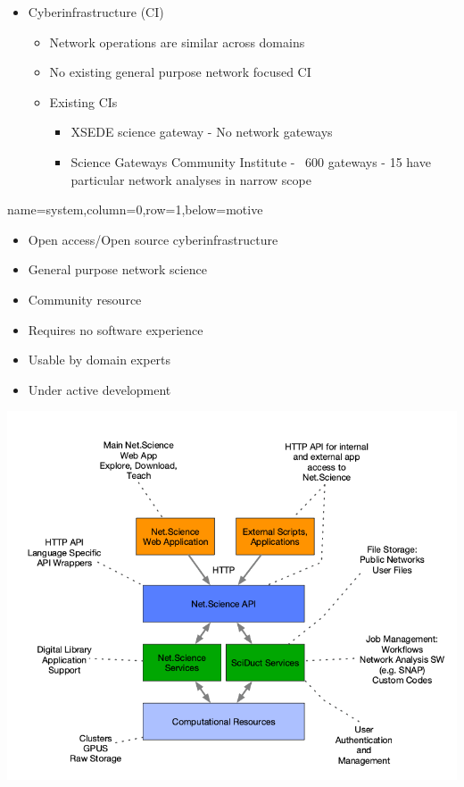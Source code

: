\documentclass[landscape,paperwidth=70in,paperheight=46in,fontscale=0.225]{baposter} %
\begin{document}
\begin{poster}
{\begin{itemize}[leftmargin=*,noitemsep,topsep=0pt]
\item Cyberinfrastructure (CI)
	\begin{itemize}
	\item Network operations are similar across domains
	\item No existing general purpose network focused CI
	\item Existing CIs
	\begin{itemize}
	    \item XSEDE science gateway - No network gateways
	    \item Science Gateways Community Institute - ~600 gateways - 15 have
	    particular network analyses in narrow scope
	\end{itemize}
	\end{itemize}
\end{itemize}
\vspace*{0.2in}
}

          {name=system,column=0,row=1,below=motive}{

\begin{minipage}{.5\textwidth}
\begin{itemize}[leftmargin=*,noitemsep,topsep=0pt]
\item Open access/Open source cyberinfrastructure \smallskip
\item General purpose network science \smallskip
\item Community resource \smallskip
\item Requires no software experience \smallskip
\item Usable by domain experts \smallskip
\item Under active development
\end{itemize}
\end{minipage}
\hfill
\begin{minipage}{.5\textwidth}
\begin{center}
\includegraphics[scale=0.22]{figures/sys_descr.png}
\end{center}
\end{minipage}
\vspace*{0.2in}
}


\end{poster}
\end{document}
